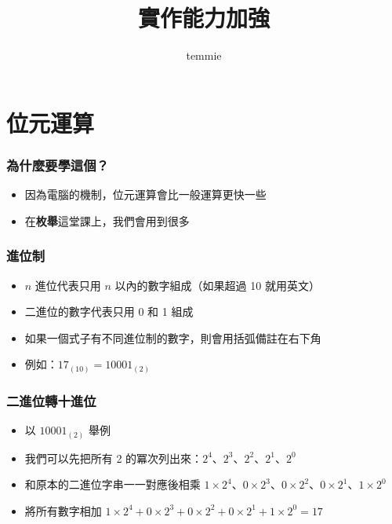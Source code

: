 \documentclass[mathserif]{beamer}
\title{實作能力加強}
\author{temmie}
\date{}
\begin{document}
\begin{frame}
    \titlepage
\end{frame}

\begin{frame}
    \tableofcontents
\end{frame}

\section{位元運算}

\begin{frame}
    \frametitle{為什麼要學這個？}
    \begin{itemize}
        \item 因為電腦的機制，位元運算會比一般運算更快一些
        \item 在\textbf{枚舉}這堂課上，我們會用到很多
    \end{itemize}
\end{frame}

\begin{frame}
    \frametitle{進位制}
    \begin{itemize}
        \item $n$ 進位代表只用 $n$ 以內的數字組成（如果超過 10 就用英文）
        \item 二進位的數字代表只用 0 和 1 組成
        \item<2-> 如果一個式子有不同進位制的數字，則會用括弧備註在右下角
        \item<2-> 例如：$17_{(10)}=10001_{(2)}$
    \end{itemize}
\end{frame}

\begin{frame}
    \frametitle{二進位轉十進位}
    \begin{itemize}
        \item 以 $10001_{(2)}$ 舉例
        \item 我們可以先把所有 2 的冪次列出來：$2^4$、$2^3$、$2^2$、$2^1$、$2^0$
        \item<2-> 和原本的二進位字串一一對應後相乘
        $1\times 2^4$、$0\times 2^3$、$0\times 2^2$、$0\times 2^1$、$1\times 2^0$
        \item<3-> 將所有數字相加
        $1\times 2^4+0\times 2^3+0\times 2^2+0\times 2^1+1\times 2^0=17$
    \end{itemize}
\end{frame}
\end{document}
